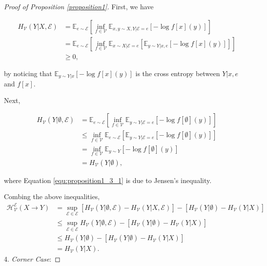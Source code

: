 \begin{proof}[Proof of Proposition \ref{proposition1}]
First, we have 
\begin{small}
\begin{align}
    H_{\mathcal V}(Y|X,\mathcal E) &= \mathbb E_{e \sim \mathcal E} \left[ \inf\limits_{f\in\mathcal{V}}\mathbb{E}_{x,y\sim X,Y|\mathcal E=e}[-\log f[x](y)] \right] \\
    &= \mathbb E_{e \sim \mathcal E} \left[ \inf\limits_{f\in\mathcal{V}}\mathbb{E}_{x\sim X|\mathcal E=e} \left[\mathbb E_{y \sim Y|x,e}[-\log f[x](y)] \right] \right]  \\
    &\geq 0,
\end{align}
\end{small}
by noticing that $\mathbb E_{y \sim Y|x}[-\log f[x](y)]$ is the cross entropy between $Y|x,e$ and $f[x]$.

Next,
\begin{small}
\begin{align}
    H_{\mathcal V}(Y|\emptyset,\mathcal E) &= \mathbb E_{e \sim \mathcal E} \left[ \inf\limits_{f\in\mathcal{V}}\mathbb{E}_{y\sim Y|\mathcal E=e}[-\log f[\emptyset](y)] \right] \\
    \label{equ:proposition1_3_1}
    &\leq \inf\limits_{f\in\mathcal{V}} \mathbb E_{e \sim \mathcal E} \left[ \mathbb{E}_{y\sim Y|\mathcal E=e}[-\log f[\emptyset](y)] \right] \\
    &= \inf\limits_{f\in\mathcal{V}} \mathbb{E}_{y\sim Y}[-\log f[\emptyset](y)] \\
    &= H_{\mathcal V}(Y|\emptyset),
\end{align}
\end{small}
where Equation \ref{equ:proposition1_3_1} is due to Jensen's inequality.

Combing the above inequalities,
\begin{align}
    \mathcal{H}^{\mathscr E}_{\mathcal V}(X \rightarrow Y) &=
    \sup_{\mathcal{E} \in \mathscr E} \left[H_\mathcal V(Y|\emptyset,\mathcal E) - H_\mathcal V(Y|X,\mathcal E)\right] - \left[H_\mathcal V(Y|\emptyset) - H_\mathcal V(Y|X)\right] \\
    &\leq  \sup_{\mathcal{E} \in \mathscr E} H_\mathcal V(Y|\emptyset,\mathcal E)  - \left[H_\mathcal V(Y|\emptyset) - H_\mathcal V(Y|X)\right] \\
    &\leq H_\mathcal V(Y|\emptyset) - \left[H_\mathcal V(Y|\emptyset) - H_\mathcal V(Y|X)\right] \\
    &= H_\mathcal V(Y|X).
\end{align}
4. \emph{Corner Case}:


\end{proof}
